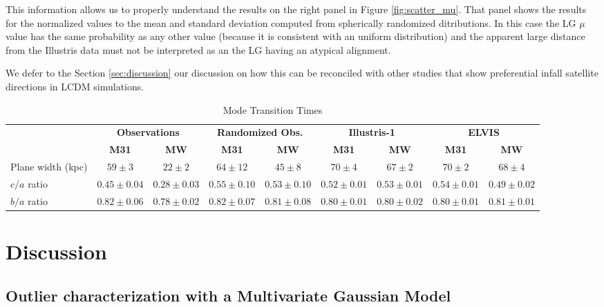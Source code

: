 \documentclass[a4paper,fleqn,usenatbib]{mnras}
\begin{document}
This information allows us to properly understand the results on the
right panel in Figure \ref{fig:scatter_mu}.
That panel shows the results for the normalized values to the mean and
standard deviation computed from spherically randomized
ditributions.
In this case the LG $\mu$ value has the same probability as any other value
(because it is consistent with an uniform distribution) and the apparent
large distance from the Illustris data must not be interpreted as an
the LG having an atypical alignment. 

We defer to the Section \ref{sec:discussion} our discussion on how
this can be reconciled with other studies that show preferential
infall satellite directions in LCDM simulations.


\begin{table}
  \centering
  \renewcommand{\arraystretch}{1.2}
  \begin{tabular}{|p{2.5cm}|c|c|c|c|c|c|c|c|}
    \hline
    \multirow{2}{4.0cm}{} & \multicolumn{2}{c|}{\textbf{Observations}} & \multicolumn{2}{c|}{\textbf{Randomized Obs.}} & \multicolumn{2}{c|}{\textbf{Illustris-1}} & \multicolumn{2}{c|}{\textbf{ELVIS}}\\
    \cline{2-9}
    & \textbf{M31} & \textbf{MW} & \textbf{M31} & \textbf{MW} & \textbf{M31} & \textbf{MW}& \textbf{M31} & \textbf{MW}\\
    \hline
    Plane width (kpc) & $59\pm 3$  & $22\pm 2$  & $64\pm 12$   & $45\pm 8$     & $70\pm 4$ & $67\pm 2$ & $70\pm 2$& $68\pm 4$ \\\hline
    $c/a$ ratio & $0.45\pm 0.04$ & $0.28\pm 0.03$ & $0.55\pm0.10$ & $0.53\pm 0.10$ & $0.52\pm 0.01$ & $0.53\pm 0.01$ & $0.54\pm 0.01$& $0.49\pm 0.02$ \\ \hline
    $b/a$ ratio & $0.82\pm 0.06$ & $0.78\pm 0.02$ & $0.82\pm0.07$ & $0.81\pm 0.08$ & $0.80\pm 0.01$ & $0.80\pm 0.02$ & $0.80\pm0.01$& $0.81\pm 0.01$\\ \hline
  \end{tabular}
  \caption{Mode Transition Times}
\end{table}

\section{Discussion}
\subsection{Outlier characterization with a Multivariate Gaussian Model}
\end{document}
